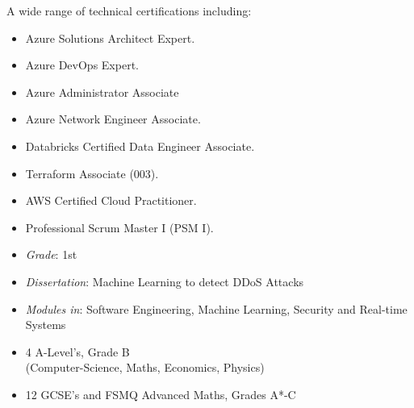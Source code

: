 \documentclass[10pt,a4paper,ragged2e]{maltacv}
\begin{document}
\bigskip


{\normalfont
  A wide range of technical certifications including: \
  \smallskip

  \begin{multicols}{2}
    \begin{itemize}
      \item Azure Solutions Architect Expert.
      \item Azure DevOps Expert.
      \item Azure Administrator Associate 
      \item Azure Network Engineer Associate.
      \item Databricks Certified Data Engineer Associate.
      \item Terraform Associate (003).
      \item AWS Certified Cloud Practitioner.
      \item Professional Scrum Master I (PSM I).
    \end{itemize}
  \end{multicols}
}

\bigskip
{}
\bigskip
\begin{multicols}{2}

  \begin{itemize}
      \item \textit{Grade}: 1st
      \item \textit{Dissertation}: Machine Learning to detect DDoS Attacks
      \item \textit{Modules in}: Software Engineering, Machine Learning, Security and Real-time Systems
  \end{itemize}

  \begin{itemize}
      \item 4 A-Level’s, Grade B \\ (Computer-Science, Maths,  Economics, Physics)
      \item 12 GCSE’s and FSMQ Advanced Maths, Grades A*-C
  \end{itemize}
  \hspace{0pt}
\end{multicols}
\end{document}
